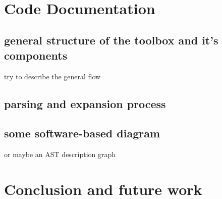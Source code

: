 \documentclass{thesul}
\begin{document}
\hfill\\

\chapter{Code Documentation}

\section{general structure of the toolbox and it's components}
try to describe the general flow

\section{parsing and expansion process}

\section{some software-based diagram}

or maybe an AST description graph

\chapter{Conclusion and future work}


\end{document}
